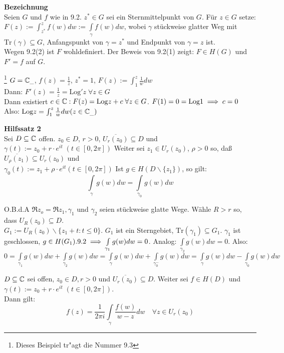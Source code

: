 \documentclass[a4paper,twoside,DIV15,BCOR12mm]{scrbook}
\def\Log{\text{Log}}
\def\Tr{\text{Tr}}
\def\wegint{\ensuremath{\int\limits_\gamma}}
\begin{document}
\textbf{Bezeichnung} \\
Seien $G$ und $f$ wie in 9.2. $z^* \in G$ sei ein Sternmittelpunkt von $G$. Für $z \in G$ setze: $F(z) := \int_{z^*}^{z} f(w) dw := \wegint f(w) dw$, wobei $\gamma$  stückweise glatter Weg mit $\Tr(\gamma) \subseteq G$, Anfangspunkt von $\gamma = z^*$ und Endpunkt von $\gamma = z$ ist.\\ Wegen 9.2(2) ist $F$ wohldefiniert. Der Beweis von 9.2(1) zeigt: $F \in H(G)$ und $F'=f$ auf $G$.

\begin{beispiel}\footnote{Dieses Beispiel tr"agt die Nummer 9.3}
$G = \mathbb{C}_{\_}$, $f(z) = \frac{1}{z}$, $z^* = 1$,
$F(z) := \int_{1}^{z} \frac{1}{w} dw$ \\
Dann: $F'(z) = \frac{1}{z} = \Log ' z \; \forall z \in G$ \\
Dann existiert $c \in \MdC : F(z) = \Log z + c \;\forall z \in G$. $F(1) = 0 = \Log 1 \folgt c = 0$\\
Also: $\Log z = \int_{1}^{z} \frac{1}{w} dw (z \in \MdC_{\_})$
\end{beispiel}

\textbf{Hilfssatz 2} \\
Sei $D \subseteq \mathbb{C}$ offen. $z_0 \in D$, $r > 0$, $ \overline{U_r (z_0)} \subseteq D$ und $\gamma(t) := z_0 + r \cdot e^{it} \; (t \in [0,2\pi])$
Weiter sei $z_1 \in U_r (z_0)$, $\rho > 0$ so, daß $\overline{U_{\rho} (z_1)} \subseteq U_r (z_0)$ und \\
$\gamma_0 (t) := z_1 + \rho \cdot e^{it} (t \in [0,2\pi])$
Ist $g \in H (D\backslash \{z_1\})$, so gilt: 
$$\wegint g(w) dw = \int\limits_{\gamma _0} g(w) dw$$
\begin{beweis}
O.B.d.A $\Re z_o = \Re z_1, \gamma _1$ und $\gamma _2$ seien stückweise glatte Wege. Wähle $R > r$ so, dass $U_R(z_0) \subseteq D$. \\
$G_1 := U_R(z_0) \backslash \{z_1 + t : t \leq 0\}$. $G_1$ ist ein Sterngebiet, $\Tr (\gamma _1) \subseteq G_1$. $\gamma _1$ ist geschlossen, $g \in H(G_1). 9.2 \implies \int\limits _{\gamma _1} g(w) dw = 0$. Analog: $\int\limits _{\gamma _2} g(w) dw = 0$. Also:\\
$0 = \int\limits _{\gamma _1} g(w) dw + \int\limits _{\gamma _2} g(w) dw = \int\limits _{\gamma} g(w) dw + \int\limits _{\gamma _0^-} g(w) dw = \int\limits _{\gamma} g(w) dw - \int\limits _{\gamma _0} g(w) dw$
\end{beweis}

\setcounter{satz}{3}
\begin{satz}
$D\subseteq \mathbb{C}$ sei offen, $z_0 \in D, r>0$ und $\overline{U_r(z_0)} \subseteq D$. Weiter sei $f \in H(D)$ und $\gamma (t) := z_0 + r\cdot e^{it} \; (t \in [0,2\pi ])$.\\
Dann gilt:
$$f(z) = \frac{1}{2\pi i}\wegint\frac{f(w)}{w-z}dw\quad\forall z\in U_r(z_0)$$
\end{satz}
\end{document}

